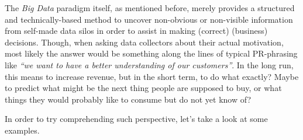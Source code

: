 \documentclass[12pt,english,a4paper,titlepage,cleardoublepage=empty,dottedtoc]{report}
\begin{document}
The \emph{Big Data} paradigm itself, as mentioned before, merely
provides a structured and technically-based method to uncover
non-obvious or non-visible information from self-made data silos in
order to assist in making (correct) (business) decisions. Though, when
asking data collectors about their actual motivation, most likely the
answer would be something along the lines of typical PR-phrasing like
\emph{``we want to have a better understanding of our customers''}. In
the long run, this means to increase revenue, but in the short term, to
do what exactly? Maybe to predict what might be the next thing people
are supposed to buy, or what things they would probably like to consume
but do not yet know of?

In order to try comprehending such perspective, let's take a look at
some examples.
\end{document}
